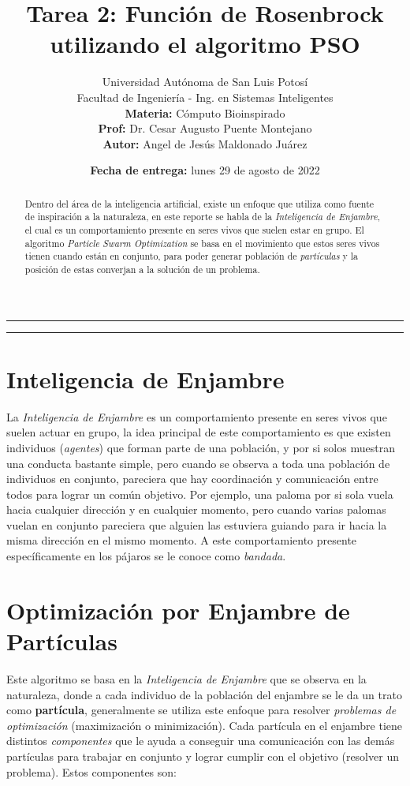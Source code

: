 \documentclass[12pt, a4paper]{article}
\title{\vspace{-3cm}Tarea 2: Función de Rosenbrock utilizando el algoritmo PSO}
\author{
    Universidad Autónoma de San Luis Potosí\\ 
    Facultad de Ingeniería - Ing. en Sistemas Inteligentes\\ 
    \textbf{Materia:} Cómputo Bioinspirado \\
    \textbf{Prof:} Dr. Cesar Augusto Puente Montejano  \\
    \textbf{Autor:} Angel de Jesús Maldonado Juárez
}
\date{\textbf{Fecha de entrega:} lunes 29 de agosto de 2022}
\begin{document}
    \maketitle
    
    \begin{center}
        \rule{\textwidth}{0.5pt}
        \begin{abstract}
            \noindent Dentro del área de la inteligencia artificial, existe un enfoque que utiliza como fuente de inspiración a la naturaleza, en este reporte se habla de la \emph{Inteligencia de Enjambre}, el cual es un comportamiento presente en seres vivos que suelen estar en grupo. El algoritmo \emph{Particle Swarm Optimization} se basa en el movimiento que estos seres vivos tienen cuando están en conjunto, para poder generar población de \emph{partículas} y la posición de estas converjan a la solución de un problema. 
        \end{abstract}
        \rule{\textwidth}{0.5pt}
    \end{center}
    
    \section{Inteligencia de Enjambre}\label{title1}
        La \emph{Inteligencia de Enjambre} es un comportamiento presente en seres vivos que suelen actuar en grupo, la idea principal de este comportamiento es que existen individuos (\emph{agentes}) que forman parte de una población, y por si solos muestran una conducta bastante simple, pero cuando se observa a toda una población de individuos en conjunto, pareciera que hay coordinación y comunicación entre todos para lograr un común objetivo. Por ejemplo, una paloma por si sola vuela hacia cualquier dirección y en cualquier momento, pero cuando varias palomas vuelan en conjunto pareciera que alguien las estuviera guiando para ir hacia la misma dirección en el mismo momento. A este comportamiento presente específicamente en los pájaros se le conoce como \emph{bandada}.
    
    \section{Optimización por Enjambre de Partículas}
        Este algoritmo se basa en la \emph{Inteligencia de Enjambre} que se observa en la naturaleza, donde a cada individuo de la población del enjambre se le da un trato como \textbf{partícula}, generalmente se utiliza este enfoque para resolver \emph{problemas de optimización} (maximización  o minimización). Cada partícula en el enjambre tiene distintos \emph{componentes} que le ayuda a conseguir una comunicación con las demás partículas para trabajar en conjunto y lograr cumplir con el objetivo (resolver un problema). Estos componentes son:
\end{document}
